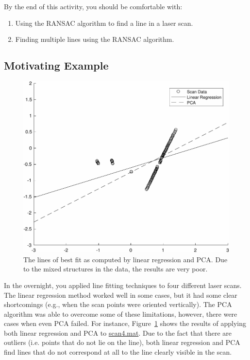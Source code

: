 \documentclass{tufte-handout}
\begin{document}
By the end of this activity, you should be comfortable with:
\begin{enumerate}
\item Using the RANSAC algorithm to find a line in a laser scan.
\item Finding multiple lines using the RANSAC algorithm.
\end{enumerate}

\subsection{Motivating Example}
\begin{figure}
\begin{center}
\includegraphics[width=.8\linewidth]{Figures/naivelinefit-eps-converted-to.pdf}
\end{center}
\caption{The lines of best fit as computed by linear regression and PCA.  Due to the mixed structures in the data, the results are very poor.\label{fig:naivefit}}
\end{figure}

In the overnight, you applied line fitting techniques to four different laser scans.  The linear regression method worked well in some cases, but it had some clear shortcomings (e.g., when the scan points were oriented vertically).  The PCA algorithm was able to overcome some of these limitations, however, there were cases when even PCA failed.  For instance, Figure~\ref{fig:naivefit} shows the results of applying both linear regression and PCA to \href{https://drive.google.com/file/d/1bDu-QAPmyNc4SRFicWCiNtEOgpAmaB_g/view?usp=sharing}{scan4.mat}.  Due to the fact that there are outliers (i.e. points that do not lie on the line), both linear regression and PCA find lines that do not correspond at all to the line clearly visible in the scan.
\end{document}
